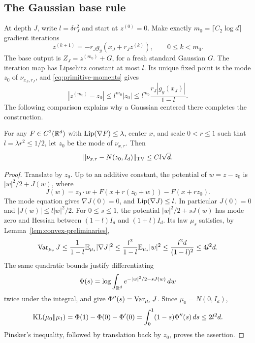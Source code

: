 \subsection{The Gaussian base rule}

At depth $J$, write $l=\delta r_J^2$ and start at $z^{(0)}=0$.
Make exactly $m_0=\lceil C_2\log d\rceil$ gradient iterations
\begin{equation}\label{eq:mode-iteration}
 z^{(k+1)}=-r_Jg_y(x_J+r_Jz^{(k)}),
                         \qquad 0\le k<m_0.
\end{equation}
The base output is $Z_J=z^{(m_0)}+G$, for a fresh standard
Gaussian $G$. The iteration map has Lipschitz constant at most $l$.
Its unique fixed point is the mode $z_0$ of $\nu_{x_J,r_J}$, and
\eqref{eq:primitive-moments} gives
\begin{equation}\label{eq:mode-accuracy}
 |z^{(m_0)}-z_0|
       \le l^{m_0}|z_0|
       \le l^{m_0}\frac{r_J|g_y(x_J)|}{1-l}.
\end{equation}
The following comparison explains why a Gaussian centered there
completes the construction.

\begin{lemma}
\label{lem:mode-gaussian}
For any $F\in C^2(\mathbb R^d)$ with $\operatorname{Lip}(\nabla F)\le\lambda$, center
$x$, and scale $0<r\le1$ such that $l=\lambda r^2\le1/2$, let $z_0$ be
the mode of $\nu_{x,r}$. Then
\[
 \lVert\nu_{x,r}-N(z_0,I_d)\rVert_{\mathrm{TV}}\le Cl\sqrt d.
\]
\end{lemma}
\begin{proof}
Translate by $z_0$. Up to an additive constant, the potential of
$w=z-z_0$ is $|w|^2/2+J(w)$, where
\[
 J(w)=z_0\cdot w+F(x+r(z_0+w))-F(x+rz_0).
\]
The mode equation gives $\nabla J(0)=0$, and
$\operatorname{Lip}(\nabla J)\le l$. In particular $J(0)=0$ and
$|J(w)|\le l|w|^2/2$.
For $0\le s\le1$, the potential $|w|^2/2+sJ(w)$ has mode zero
and Hessian between $(1-l)I_d$ and $(1+l)I_d$.
Its law $\mu_s$ satisfies, by Lemma~\ref{lem:convex-preliminaries},
\[
 \operatorname{Var}_{\mu_s}J
 \le\frac1{1-l}\mathbb E_{\mu_s}|\nabla J|^2
 \le\frac{l^2}{1-l}\mathbb E_{\mu_s}|w|^2
 \le\frac{l^2d}{(1-l)^2}\le4l^2d.
\]
The same quadratic bounds justify differentiating
\[
 \Phi(s)=\log\int_{\mathbb R^d}e^{-|w|^2/2-sJ(w)}\,dw
\]
twice under the integral, and give
$\Phi''(s)=\operatorname{Var}_{\mu_s}J$. Since $\mu_0=N(0,I_d)$,
\[
 \operatorname{KL}(\mu_0\Vert\mu_1)
  =\Phi(1)-\Phi(0)-\Phi'(0)
  =\int_0^1(1-s)\Phi''(s)\,ds\le2l^2d.
\]
Pinsker's inequality, followed by translation back by $z_0$,
proves the assertion.
\end{proof}

